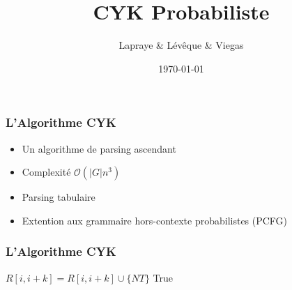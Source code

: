 \documentclass{beamer}
\begin{document}
\title{CYK Probabiliste}  %
\author{Lapraye \& Lévêque \& Viegas}

\date{\today}


\begin{frame}
 \maketitle
\end{frame}

\begin{frame}
\frametitle{L'Algorithme CYK}
\begin{itemize}%
  \item<1-4>{Un algorithme de parsing ascendant}
  \item<2-4>{Complexité $\mathcal{O}(|G|n^3) $ } %
  \item<3-4>{Parsing tabulaire}
  \item<4>{Extention aux grammaire hors-contexte probabilistes (PCFG)}
 \end{itemize}
 
\end{frame}

\begin{frame}
\frametitle{L'Algorithme CYK}
\fontsize{6}{7.2}\selectfont
	\begin{algorithmic}
			    \EndIf 
			\EndFor
			
					    \ForAll{$ $}
							  \State $R[i,i+k] = R[i,i+k] \cup \{NT\}$
							\EndIf
						\EndFor
					    \EndFor
				      \EndFor
			      \EndFor
			  \EndFor
		      \EndFor
		  \Return True
		\EndIf
		\EndFunction
	\end{algorithmic} 
\end{frame}
\end{document}
